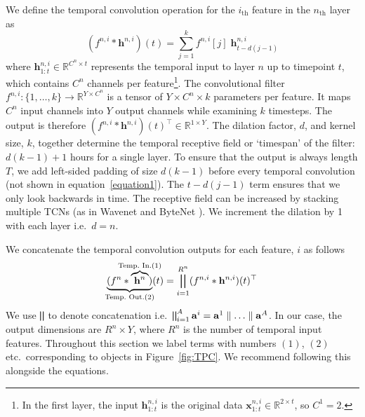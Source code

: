 \documentclass[sigconf]{acmart}
\begin{document}
We define the temporal convolution operation for the $i_\text{th}$ feature in the $n_\text{th}$ layer as \begin{equation}\label{equation1}
    (f^{n,i} \ast \mathbf{h}^{n,i})(t) = \sum_{j=1}^{k}f^{n,i}[j] \; \mathbf{h}_{t-d(j-1)}^{n,i}
\end{equation}
where $\mathbf{h}_{1:t}^{n,i}\in\mathbb{R}^{C^{n} \times t}$ represents the temporal input to layer $n$ up to timepoint $t$, which contains $C^{n}$ channels per feature\footnote{In the first layer, the input $\mathbf{h}_{1:t}^{n,i}$ is the original data $\mathbf{x}_{1:t}^{n,i}\in\mathbb{R}^{2 \times t}$, so $C^{1}=2$.}.
The convolutional filter $f^{n,i}:\{1,\ldots,k\}\to\mathbb{R}^{Y \times C^{n}}$ is a tensor of $Y\times C^{n} \times k$ parameters per feature. It maps $C^{n}$ input channels into $Y$ output channels while examining $k$ timesteps. The output is therefore $(f^{n,i} \ast \mathbf{h}^{n,i})(t)^{\top}\in\mathbb{R}^{1\times Y}$. 
The dilation factor, $d$, and kernel size, $k$, together determine the temporal receptive field or `timespan' of the filter: $d(k-1) + 1$ hours for a single layer. To ensure that the output is always length $T$, we add left-sided padding of size $d(k-1)$ before every temporal convolution (not shown in equation~\ref{equation1}). The $t-d(j-1)$ term ensures that we only look backwards in time. The receptive field can be increased by stacking multiple TCNs (as in Wavenet \citep{Simonyan2016} and ByteNet \citep{DBLP:journals/corr/KalchbrennerESO16}). We increment the dilation by 1 with each layer i.e.\ $d=n$.

We concatenate the temporal convolution outputs for each feature, $i$ as follows
\begin{equation}
    \underbrace{(f^{n} \ast \overbrace{\mathbf{h}^{n}}^{\mathclap{\text{Temp.\ In.}(1)}})}_{\mathclap{\text{Temp.\ Out.}(2)}}(t) = \bigparallel_{i=1}^{R^{n}}(f^{n,i} \ast \mathbf{h}^{n,i})(t)^{\top}
\end{equation}
We use $\bigparallel$ to denote concatenation i.e.\ $\bigparallel^{A}_{i=1}\mathbf{a}^{i} = \mathbf{a}^{1}\parallel\ldots\parallel\mathbf{a}^{A}$. In our case, the output dimensions are $R^{n} \times Y$, where $R^{n}$ is the number of temporal input features. Throughout this section we label terms with numbers $(1)$, $(2)$ etc.\ corresponding to objects in Figure~\ref{fig:TPC}. We recommend following this alongside the equations.
\end{document}
